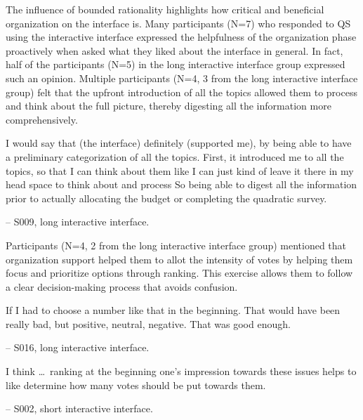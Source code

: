 
The influence of bounded rationality highlights how critical and beneficial organization on the interface is. Many participants (N=7) who responded to QS using the interactive interface expressed the helpfulness of the organization phase proactively when asked what they liked about the interface in general. In fact, half of the participants (N=5) in the long interactive interface group expressed such an opinion. Multiple participants (N=4, 3 from the long interactive interface group) felt that the upfront introduction of all the topics allowed them to process and think about the full picture, thereby digesting all the information more comprehensively. 

\begin{displayquote}
I would say that (the interface) definitely (supported me), by being able to have a preliminary categorization of all the topics. First, it introduced me to all the topics, so that I can think about them like I can just kind of leave it there in my head space to think about and process \bracketellipsis So being able to digest all the information prior to actually allocating the budget or completing the quadratic survey.

\noindent \hfill -- S009, long interactive interface.
\end{displayquote}

Participants (N=4, 2 from the long interactive interface group) mentioned that organization support helped them to allot the intensity of votes by helping them focus and prioritize options through ranking. This exercise allows them to follow a clear decision-making process that avoids confusion.

\begin{displayquote}
If I had to choose a number like that in the beginning. That would have been really bad, but positive, neutral, negative. That was good enough.

\noindent \hfill -- S016, long interactive interface.
\end{displayquote}

\begin{displayquote}
I think \ldots\ ranking at the beginning one's impression towards these issues helps to like determine how many votes should be put towards them. 

\noindent \hfill -- S002, short interactive interface.
\end{displayquote}

